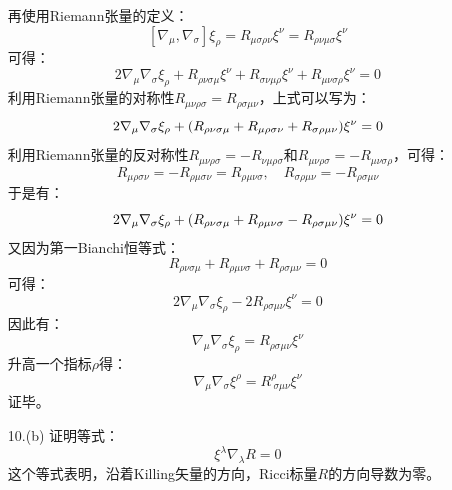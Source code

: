 \documentclass[a4paper]{article}
\begin{document}
\begin{enumerate}
    再使用Riemann张量的定义：
    \[
        [\nabla_\mu, \nabla_\sigma] \xi_\rho = R_{\mu\sigma\rho\nu} \xi^\nu = R_{\rho\nu\mu\sigma} \xi^\nu
    \]
    可得：
    \[
        2\nabla_\mu \nabla_\sigma \xi_\rho + R_{\rho\nu\sigma\mu} \xi^\nu + R_{\sigma\nu\mu\rho} \xi^\nu + R_{\mu\nu\sigma\rho} \xi^\nu = 0
    \]
    利用Riemann张量的对称性$R_{\mu\nu\rho\sigma} = R_{\rho\sigma\mu\nu}$，上式可以写为：
    \[
        2\nabla_\mu \nabla_\sigma \xi_\rho + \qty(R_{\rho\nu\sigma\mu} + R_{\mu\rho\sigma\nu} + R_{\sigma\rho\mu\nu}) \xi^\nu = 0
    \]
    利用Riemann张量的反对称性$R_{\mu\nu\rho\sigma} = -R_{\nu\mu\rho\sigma}$和$R_{\mu\nu\rho\sigma} = -R_{\mu\nu\sigma\rho}$，可得：
    \[
        R_{\mu\rho\sigma\nu} = -R_{\rho\mu\sigma\nu} = R_{\rho\mu\nu\sigma},\quad R_{\sigma\rho\mu\nu} = -R_{\rho\sigma\mu\nu}
    \]
    于是有：
    \[
        2\nabla_\mu \nabla_\sigma \xi_\rho + \qty(R_{\rho\nu\sigma\mu} + R_{\rho\mu\nu\sigma} - R_{\rho\sigma\mu\nu}) \xi^\nu = 0
    \]
    又因为第一Bianchi恒等式：
    \[
        R_{\rho\nu\sigma\mu} + R_{\rho\mu\nu\sigma} + R_{\rho\sigma\mu\nu} = 0
    \]
    可得：
    \[
        2\nabla_\mu \nabla_\sigma \xi_\rho - 2R_{\rho\sigma\mu\nu} \xi^\nu = 0
    \]
    因此有：
    \[
        \nabla_\mu \nabla_\sigma \xi_\rho = R_{\rho\sigma\mu\nu} \xi^\nu
    \]
    升高一个指标$\rho$得：
    \[
        \nabla_\mu \nabla_\sigma \xi^\rho = R^{\rho}_{\ \sigma\mu\nu} \xi^\nu
    \]
    证毕。

    \bigskip
    \item[10.(b)]
    证明等式：
    \[
        \xi^\lambda \nabla_\lambda R = 0
    \]
    这个等式表明，沿着Killing矢量的方向，Ricci标量$R$的方向导数为零。


\end{enumerate}
\end{document}

